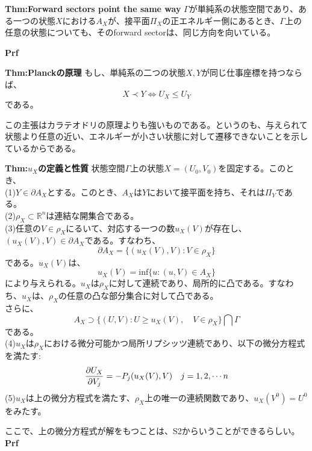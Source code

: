 \documentclass[a4paper,11pt]{jsarticle}
\begin{document}
\begin{itembox}[l]{\textbf{Thm:Forward sectors point the same way}}
    $\Gamma$が単純系の状態空間であり、ある一つの状態$X$における$A_X$が、接平面$\Pi_X$の正エネルギー側にあるとき、$\Gamma$上の任意の状態についても、そのforward sectorは、同じ方向を向いている。
\end{itembox}
\textbf{Prf}\\

\begin{itembox}[l]{\textbf{Thm:Planckの原理}}
    もし、単純系の二つの状態$X,Y$が同じ仕事座標を持つならば、
    \begin{equation}
        X \prec Y \Leftrightarrow U_X \leq U_Y
    \end{equation}
    である。
\end{itembox}
この主張はカラテオドリの原理よりも強いものである。というのも、与えられて状態より任意の近い、エネルギーが小さい状態に対して遷移できないことを示しているからである。\\

\begin{itembox}[l]{\textbf{Thm:$u_X$の定義と性質}}
    状態空間$\Gamma$上の状態$X=(U_0,V_0)$を固定する。このとき、\\
    (1)$Y\in \partial A_X$とする。このとき、$A_X$は$Y$において接平面を持ち、それは$\Pi_Y$である。\\
    (2)$\rho_X \subset \mathbb{R}^n $は連結な開集合である。\\
    (3)任意の$V \in \rho_X$にるいて、対応する一つの数$u_X(V)$が存在し、$(u_X(V),V) \in \partial A_X$である。すなわち、
    \begin{equation}
        \partial A_X =\{(u_X(V),V):V \in \rho_X\}
    \end{equation}
    である。$u_X(V)$は、
    \begin{equation}
        u_X(V) =\text{inf}\{u:(u,V) \in A_X \}
    \end{equation}
    により与えられる。$u_X$は$\rho_X$に対して連続であり、局所的に凸である。すなわち、$u_X$は、$\rho_X$の任意の凸な部分集合に対して凸である。\\
    さらに、
    \begin{equation}
        A_X \supset \{(U,V):U \geq u_X(V),\quad V\in \rho_X\} \bigcap \Gamma
    \end{equation}
    である。\\
    (4)$u_X$は$\rho_X$における微分可能かつ局所リプシッツ連続であり、以下の微分方程式を満たす:
    \begin{equation}
        \pdv{U_X}{V_j}(V) =-P_j (u_X(V),V) \quad j=1,2,\cdots n
    \end{equation}
    (5)$u_X$は上の微分方程式を満たす、$\rho_X$上の唯一の連続関数であり、$u_X(V^0) =U^0$をみたす。
\end{itembox}
ここで、上の微分方程式が解をもつことは、S2からいうことができるらしい。\\
\textbf{Prf}\\
\end{document}
